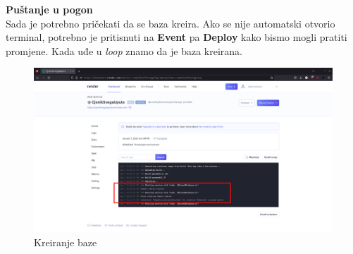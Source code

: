 			
			\textbf{Puštanje u pogon}\\
			
			
			Sada je potrebno pričekati da se baza kreira. Ako se nije automatski otvorio terminal, potrebno je pritisnuti na \textbf{Event} pa \textbf{Deploy} kako bismo mogli pratiti promjene. Kada uđe u \textit{loop} znamo da je baza kreirana.
			
			\begin{figure}[H]
			\includegraphics[width=\textwidth]{slike/seeddb.png} %
			\caption{Kreiranje baze}
			\label{fig:seeddb} %
			\end{figure}
			
